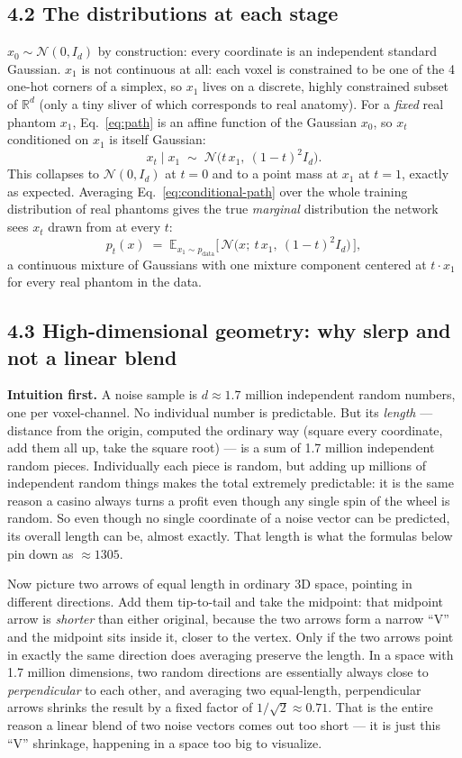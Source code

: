 \documentclass[11pt]{article}
\newcommand{\hsub}[1]{\subsection*{#1}}
\begin{document}
\hsub{4.2 The distributions at each stage}
$x_0 \sim \mathcal{N}(0, I_d)$ by construction: every coordinate is an independent standard
Gaussian. $x_1$ is not continuous at all: each voxel is constrained to be one of the 4
one-hot corners of a simplex, so $x_1$ lives on a discrete, highly constrained subset of
$\mathbb{R}^d$ (only a tiny sliver of which corresponds to real anatomy). For a \emph{fixed}
real phantom $x_1$, Eq.~\eqref{eq:path} is an affine function of the Gaussian $x_0$, so $x_t$
conditioned on $x_1$ is itself Gaussian:
\begin{equation}
x_t \mid x_1 \;\sim\; \mathcal{N}\big(t\,x_1,\ (1-t)^2 I_d\big). \label{eq:conditional-path}
\end{equation}
This collapses to $\mathcal{N}(0,I_d)$ at $t=0$ and to a point mass at $x_1$ at $t=1$, exactly
as expected. Averaging Eq.~\eqref{eq:conditional-path} over the whole training distribution of
real phantoms gives the true \emph{marginal} distribution the network sees $x_t$ drawn from
at every $t$:
\begin{equation}
p_t(x) \;=\; \mathbb{E}_{x_1 \sim p_{\text{data}}}\Big[\, \mathcal{N}\big(x;\ t\,x_1,\ (1-t)^2 I_d\big) \,\Big],
\label{eq:marginal-path}
\end{equation}
a continuous mixture of Gaussians with one mixture component centered at $t \cdot x_1$ for
every real phantom in the data.

\hsub{4.3 High-dimensional geometry: why slerp and not a linear blend}
\textbf{Intuition first.} A noise sample is $d\approx 1.7$ million independent random numbers,
one per voxel-channel. No individual number is predictable. But its \emph{length} --- distance
from the origin, computed the ordinary way (square every coordinate, add them all up, take the
square root) --- is a sum of 1.7 million independent random pieces. Individually each piece is
random, but adding up millions of independent random things makes the total extremely
predictable: it is the same reason a casino always turns a profit even though any single spin
of the wheel is random. So even though no single coordinate of a noise vector can be predicted,
its overall length can be, almost exactly. That length is what the formulas below pin down as
$\approx 1305$.

Now picture two arrows of equal length in ordinary 3D space, pointing in different directions.
Add them tip-to-tail and take the midpoint: that midpoint arrow is \emph{shorter} than either
original, because the two arrows form a narrow ``V'' and the midpoint sits inside it, closer to
the vertex. Only if the two arrows point in exactly the same direction does averaging preserve
the length. In a space with 1.7 million dimensions, two random directions are essentially
always close to \emph{perpendicular} to each other, and averaging two equal-length,
perpendicular arrows shrinks the result by a fixed factor of $1/\sqrt{2}\approx 0.71$. That is
the entire reason a linear blend of two noise vectors comes out too short --- it is just this
``V'' shrinkage, happening in a space too big to visualize.
\end{document}
